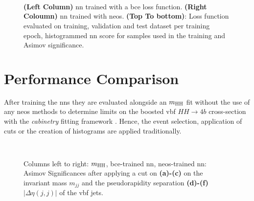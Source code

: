 \begin{figure}
    \centering
     \label{fig:neos_validation_loss}\\
     \\
     \\
    \caption[]{\textbf{(Left Column)} \ac{nn} trained with a \ac{bce} loss function. \textbf{(Right Coloumn)} \ac{nn} trained with \ac{neos}.  \textbf{(Top To bottom)}: Loss function evaluated on training, validation and test dataset per training epoch, histogrammed \ac{nn} score for samples used in the training and Asimov significance.  }
    \label{fig:training_metrics_validation}
\end{figure}



\section{Performance Comparison}
After training the \acp{nn} they are evaluated alongside an $m_\text{HH}$ fit without the use of any \ac{neos} methods to determine limits on the boosted \ac{vbf} $HH\rightarrow4b$ cross-section with the \textit{cabinetry} fitting framework \citep{cranmer_2021_4627038}. Hence, the event selection, application of cuts or the creation of histograms are applied traditionally.

\begin{figure}
    \centering
    \\
    \caption[]{Columns left to right: $m_\text{HH}$, \ac{bce}-trained \ac{nn}, \ac{neos}-trained \ac{nn}: Asimov Significances after applying a cut on \textbf{(a)-(c)} on the invariant mass $m_{jj}$ and the pseudorapidity separation \textbf{(d)-(f)} $|\Delta\eta(j,j)|$ of the \ac{vbf} jets.}
    \label{fig:cut_scan}
\end{figure}


